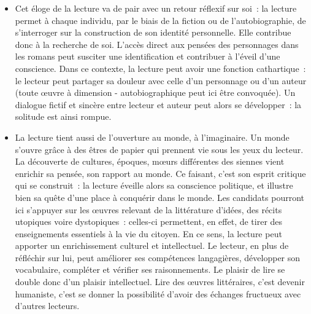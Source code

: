 {\begin{itemize}
\item Cet éloge de la lecture va de pair avec un retour réflexif sur soi~: la lecture permet à chaque
individu, par le biais de la fiction ou de l'autobiographie, de s'interroger sur la construction de son
identité personnelle. Elle contribue donc à la recherche de soi. L'accès direct aux pensées des
personnages dans les romans peut susciter une identification et contribuer à l'éveil d'une
conscience. Dans ce contexte, la lecture peut avoir une fonction cathartique~: le lecteur peut
partager sa douleur avec celle d'un personnage ou d'un auteur (toute œuvre à dimension -
autobiographique peut ici être convoquée). Un dialogue fictif et sincère entre lecteur et auteur
peut alors se développer~: la solitude est ainsi rompue.
\item La lecture tient aussi de l'ouverture au monde, à l'imaginaire. Un monde s'ouvre grâce à des
êtres de papier qui prennent vie sous les yeux du lecteur. La découverte de cultures, époques,
mœurs différentes des siennes vient enrichir sa pensée, son rapport au monde. Ce faisant, c'est
son esprit critique qui se construit~: la lecture éveille alors sa conscience politique, et illustre bien
sa quête d'une place à conquérir dans le monde. Les candidats pourront ici s'appuyer sur les
œuvres relevant de la littérature d'idées, des récits utopiques voire dystopiques~: celles-ci
permettent, en effet, de tirer des enseignements essentiels à la vie du citoyen. En ce sens, la
lecture peut apporter un enrichissement culturel et intellectuel. Le lecteur, en plus de réfléchir sur
lui, peut améliorer ses compétences langagières, développer son vocabulaire, compléter et
vérifier ses raisonnements. Le plaisir de lire se double donc d'un plaisir intellectuel. Lire des
œuvres littéraires, c'est devenir humaniste, c'est se donner la possibilité d'avoir des échanges
fructueux avec d'autres lecteurs.
\end{itemize}}

